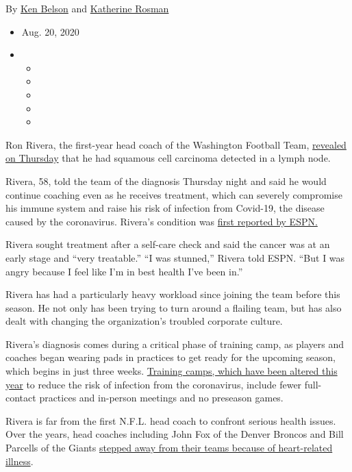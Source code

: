 By \href{https://www.nytimes3xbfgragh.onion/by/ken-belson}{Ken Belson}
and
\href{https://www.nytimes3xbfgragh.onion/by/katherine-rosman}{Katherine
Rosman}

\begin{itemize}
\item
  Aug. 20, 2020
\item
  \begin{itemize}
  \item
  \item
  \item
  \item
  \item
  \end{itemize}
\end{itemize}

Ron Rivera, the first-year head coach of the Washington Football Team,
\href{https://twitter.com/WashingtonNFL/status/1296648726983868422}{revealed
on Thursday} that he had squamous cell carcinoma detected in a lymph
node.

Rivera, 58, told the team of the diagnosis Thursday night and said he
would continue coaching even as he receives treatment, which can
severely compromise his immune system and raise his risk of infection
from Covid-19, the disease caused by the coronavirus. Rivera's condition
was
\href{https://twitter.com/AdamSchefter/status/1296610136992161792}{first
reported by ESPN.}

Rivera sought treatment after a self-care check and said the cancer was
at an early stage and ``very treatable.'' ``I was stunned,'' Rivera told
ESPN. ``But I was angry because I feel like I'm in best health I've been
in.''

Rivera has had a particularly heavy workload since joining the team
before this season. He not only has been trying to turn around a
flailing team, but has also dealt with changing the organization's
troubled corporate culture.

Rivera's diagnosis comes during a critical phase of training camp, as
players and coaches began wearing pads in practices to get ready for the
upcoming season, which begins in just three weeks.
\href{https://www.nytimes3xbfgragh.onion/2020/06/25/sports/football/nfl-preseason-hall-of-fame.html}{Training
camps, which have been altered this year} to reduce the risk of
infection from the coronavirus, include fewer full-contact practices and
in-person meetings and no preseason games.

Rivera is far from the first N.F.L. head coach to confront serious
health issues. Over the years, head coaches including John Fox of the
Denver Broncos and Bill Parcells of the Giants
\href{https://broncoswire.usatoday.com/2017/01/04/11-nfl-coaches-that-battled-health-problems-while-coaching/}{stepped
away from their teams because of heart-related illness}.

